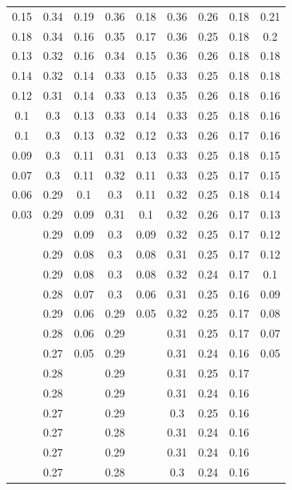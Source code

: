 \documentclass[AutoFakeBold]{LZUThesis}
\begin{document}
\begin{longtable}{ccccccccc}
    \midrule
    0.15  & 0.34  & 0.19  & 0.36  & 0.18  & 0.36  & 0.26 & 0.18 & 0.21  \\
0.18  & 0.34  & 0.16  & 0.35  & 0.17  & 0.36  & 0.25 & 0.18 & 0.2   \\
0.13  & 0.32  & 0.16  & 0.34  & 0.15  & 0.36  & 0.26 & 0.18 & 0.18  \\
0.14  & 0.32  & 0.14  & 0.33  & 0.15  & 0.33  & 0.25 & 0.18 & 0.18  \\
0.12  & 0.31  & 0.14  & 0.33  & 0.13  & 0.35  & 0.26 & 0.18 & 0.16  \\
0.1   & 0.3   & 0.13  & 0.33  & 0.14  & 0.33  & 0.25 & 0.18 & 0.16  \\
0.1   & 0.3   & 0.13  & 0.32  & 0.12  & 0.33  & 0.26 & 0.17 & 0.16  \\
0.09  & 0.3   & 0.11  & 0.31  & 0.13  & 0.33  & 0.25 & 0.18 & 0.15  \\
0.07  & 0.3   & 0.11  & 0.32  & 0.11  & 0.33  & 0.25 & 0.17 & 0.15  \\
0.06  & 0.29  & 0.1   & 0.3   & 0.11  & 0.32  & 0.25 & 0.18 & 0.14  \\
0.03  & 0.29  & 0.09  & 0.31  & 0.1   & 0.32  & 0.26 & 0.17 & 0.13  \\
      & 0.29  & 0.09  & 0.3   & 0.09  & 0.32  & 0.25 & 0.17 & 0.12  \\
      & 0.29  & 0.08  & 0.3   & 0.08  & 0.31  & 0.25 & 0.17 & 0.12  \\
      & 0.29  & 0.08  & 0.3   & 0.08  & 0.32  & 0.24 & 0.17 & 0.1   \\
      & 0.28  & 0.07  & 0.3   & 0.06  & 0.31  & 0.25 & 0.16 & 0.09  \\
      & 0.29  & 0.06  & 0.29  & 0.05  & 0.32  & 0.25 & 0.17 & 0.08  \\
      & 0.28  & 0.06  & 0.29  &       & 0.31  & 0.25 & 0.17 & 0.07  \\
      & 0.27  & 0.05  & 0.29  &       & 0.31  & 0.24 & 0.16 & 0.05  \\
      & 0.28  &       & 0.29  &       & 0.31  & 0.25 & 0.17 &       \\
      & 0.28  &       & 0.29  &       & 0.31  & 0.24 & 0.16 &       \\
      & 0.27  &       & 0.29  &       & 0.3   & 0.25 & 0.16 &       \\
      & 0.27  &       & 0.28  &       & 0.31  & 0.24 & 0.16 &       \\
      & 0.27  &       & 0.29  &       & 0.31  & 0.24 & 0.16 &       \\
      & 0.27  &       & 0.28  &       & 0.3   & 0.24 & 0.16 &       \\

\end{longtable}
\end{document}
